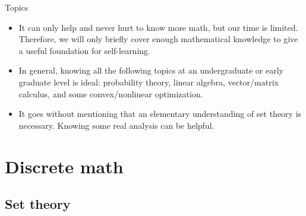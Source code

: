 \documentclass{beamer}
\begin{document}
\begin{frame}{Topics}
    \begin{itemize}
        \item
        It can only help and never hurt to know more
        math\footnotemark{}, but our time is
        limited. Therefore, we will only briefly cover enough mathematical
        knowledge to give a useful foundation for self-learning.

        \item
        In general, knowing all the following topics at an undergraduate or
        early graduate level is ideal: probability theory, linear algebra,
        vector/matrix calculus, and some convex/nonlinear optimization.

        \item
        It goes without mentioning that an elementary understanding of set
        theory is necessary. Knowing some real analysis can be helpful.
    \end{itemize}
\end{frame}

\section{Discrete math}

\subsection{Set theory}
\end{document}
